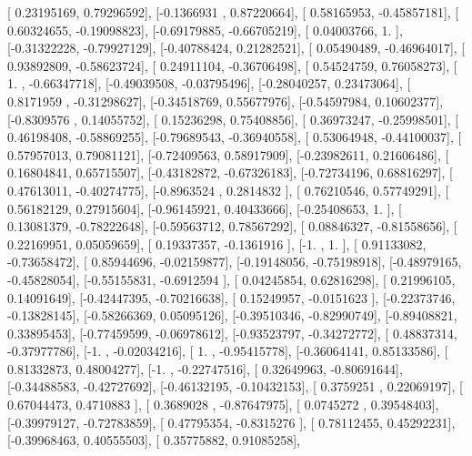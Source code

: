 \documentclass{article}
\begin{document}
       [ 0.23195169,  0.79296592],
       [-0.1366931 ,  0.87220664],
       [ 0.58165953, -0.45857181],
       [ 0.60324655, -0.19098823],
       [-0.69179885, -0.66705219],
       [ 0.04003766,  1.        ],
       [-0.31322228, -0.79927129],
       [-0.40788424,  0.21282521],
       [ 0.05490489, -0.46964017],
       [ 0.93892809, -0.58623724],
       [ 0.24911104, -0.36706498],
       [ 0.54524759,  0.76058273],
       [ 1.        , -0.66347718],
       [-0.49039508, -0.03795496],
       [-0.28040257,  0.23473064],
       [ 0.8171959 , -0.31298627],
       [-0.34518769,  0.55677976],
       [-0.54597984,  0.10602377],
       [-0.8309576 ,  0.14055752],
       [ 0.15236298,  0.75408856],
       [ 0.36973247, -0.25998501],
       [ 0.46198408, -0.58869255],
       [-0.79689543, -0.36940558],
       [ 0.53064948, -0.44100037],
       [ 0.57957013,  0.79081121],
       [-0.72409563,  0.58917909],
       [-0.23982611,  0.21606486],
       [ 0.16804841,  0.65715507],
       [-0.43182872, -0.67326183],
       [-0.72734196,  0.68816297],
       [ 0.47613011, -0.40274775],
       [-0.8963524 ,  0.2814832 ],
       [ 0.76210546,  0.57749291],
       [ 0.56182129,  0.27915604],
       [-0.96145921,  0.40433666],
       [-0.25408653,  1.        ],
       [ 0.13081379, -0.78222648],
       [-0.59563712,  0.78567292],
       [ 0.08846327, -0.81558656],
       [ 0.22169951,  0.05059659],
       [ 0.19337357, -0.1361916 ],
       [-1.        ,  1.        ],
       [ 0.91133082, -0.73658472],
       [ 0.85944696, -0.02159877],
       [-0.19148056, -0.75198918],
       [-0.48979165, -0.45828054],
       [-0.55155831, -0.6912594 ],
       [ 0.04245854,  0.62816298],
       [ 0.21996105,  0.14091649],
       [-0.42447395, -0.70216638],
       [ 0.15249957, -0.0151623 ],
       [-0.22373746, -0.13828145],
       [-0.58266369,  0.05095126],
       [-0.39510346, -0.82990749],
       [-0.89408821,  0.33895453],
       [-0.77459599, -0.06978612],
       [-0.93523797, -0.34272772],
       [ 0.48837314, -0.37977786],
       [-1.        , -0.02034216],
       [ 1.        , -0.95415778],
       [-0.36064141,  0.85133586],
       [ 0.81332873,  0.48004277],
       [-1.        , -0.22747516],
       [ 0.32649963, -0.80691644],
       [-0.34488583, -0.42727692],
       [-0.46132195, -0.10432153],
       [ 0.3759251 ,  0.22069197],
       [ 0.67044473,  0.4710883 ],
       [ 0.3689028 , -0.87647975],
       [ 0.0745272 ,  0.39548403],
       [-0.39979127, -0.72783859],
       [ 0.47795354, -0.8315276 ],
       [ 0.78112455,  0.45292231],
       [-0.39968463,  0.40555503],
       [ 0.35775882,  0.91085258],
\end{document}
